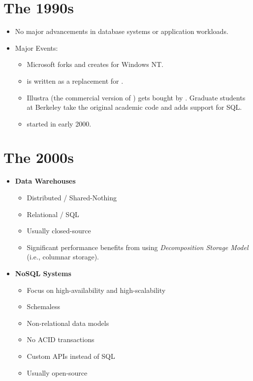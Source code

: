 \documentclass[11pt]{article}
\begin{document}
\section{The 1990s}
\begin{itemize}
    \item No major advancements in database systems or application workloads.
    \item Major Events:
    \begin{itemize}
        \item
        Microsoft forks  and creates  for Windows NT.
        
        \item
         is written as a replacement for .
        
        \item
        Illustra (the commercial version of ) gets bought by . 
        Graduate students at Berkeley take the original academic  code and adds 
        support for SQL.
        
        \item
         started in early 2000.
    \end{itemize}
\end{itemize}

\section{The 2000s}
\begin{itemize}
    \item \textbf{Data Warehouses}
    \begin{itemize}
        \item Distributed / Shared-Nothing
        \item Relational / SQL
        \item Usually closed-source
        \item
        Significant performance benefits from using \textit{Decomposition Storage Model}
        (i.e., columnar storage).
    \end{itemize}
    
    \item \textbf{NoSQL Systems}~\cite{cattell10}
    \begin{itemize}
        \item Focus on high-availability and high-scalability
        \item Schemaless
        \item Non-relational data models
        \item No ACID transactions
        \item Custom APIs instead of SQL
        \item Usually open-source
    \end{itemize}
\end{itemize}
\end{document}
